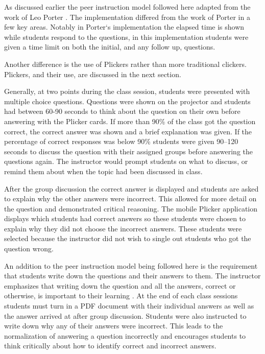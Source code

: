 \documentclass{article}
\begin{document}
As discussed earlier the peer instruction model followed here adapted from the work of Leo Porter \cite{porterPeerInstructionStudents2011}. The implementation differed from the work of Porter in a few key areas. Notably in Porter`s implementation the elapsed time is shown while students respond to the questions, in this implementation students were given a time limit on both the initial, and any follow up, questions. 

Another difference is the use of Plickers rather than more traditional clickers. Plickers, and their use, are discussed in the next section.

Generally, at two points during the class session, students were presented with multiple choice questions. Questions were shown on the projector and students had between 60-90 seconds to think about the question on their own before answering with the Plicker cards. If more than 90\% of the class got the question correct, the correct answer was shown and a brief explanation was given. If the percentage of correct responses was below 90\% students were given 90–120 seconds to discuss the question with their assigned groups before answering the questions again. The instructor would prompt students on what to discuss, or remind them about when the topic had been discussed in class. 

After the group discussion the correct answer is displayed and students are asked to explain why the other answers were incorrect. This allowed for more detail on the question and demonstrated critical reasoning. The mobile Plicker application displays which students had correct answers so these students were chosen to explain why they did not choose the incorrect answers. These students were selected because the instructor did not wish to single out students who got the question wrong.

An addition to the peer instruction model being followed here is the requirement that students write down the questions and their answers to them. The instructor emphasizes that writing down the question and all the answers, correct or otherwise, is important to their learning \cite{metcalfeMemoryTruthCorrecting2019}. At the end of each class sessions students must turn in a PDF document with their individual answers as well as the answer arrived at after group discussion. Students were also instructed to write down why any of their answers were incorrect. This leads to the normalization of answering a question incorrectly and encourages students to think critically about how to identify correct and incorrect answers.
\end{document}
